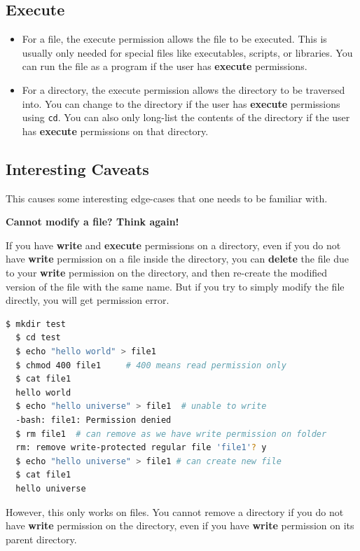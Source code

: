 \subsection{Execute}

\begin{itemize}
  \item For a file, the execute permission allows the file to be executed.
    This is usually only needed for special files like executables,
    scripts, or libraries.
    You can run the file as a program if the user has \textbf{execute} permissions.
  \item For a directory, the execute permission allows the directory to be traversed into.
    You can change to the directory if the user has \textbf{execute} permissions using \texttt{cd}.
    You can also only long-list the contents of the directory if the user has \textbf{execute} permissions on that directory.
\end{itemize}

\subsection{Interesting Caveats}

This causes some interesting edge-cases that one needs to be familiar with.

\textbf{Cannot modify a file? Think again!}

If you have \textbf{write} and \textbf{execute} permissions on a directory, even if you do not have \textbf{write} permission on a file inside the directory, you can \textbf{delete} the file due to your \textbf{write} permission on the directory, and then re-create the modified version of the file with the same name.
But if you try to simply modify the file directly, you will get permission error.

\begin{lstlisting}[language=bash]
  $ mkdir test
  $ cd test
  $ echo "hello world" > file1
  $ chmod 400 file1     # 400 means read permission only
  $ cat file1
  hello world
  $ echo "hello universe" > file1  # unable to write
  -bash: file1: Permission denied
  $ rm file1  # can remove as we have write permission on folder
  rm: remove write-protected regular file 'file1'? y
  $ echo "hello universe" > file1 # can create new file
  $ cat file1
  hello universe
\end{lstlisting}

However, this only works on files.
You cannot remove a directory if you do not have \textbf{write} permission on the directory, even if you have \textbf{write} permission on its parent directory.

